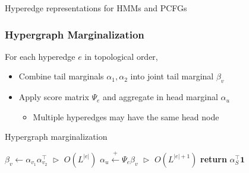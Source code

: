 \documentclass{beamer}
\begin{document}
\begin{frame}
\begin{columns}
\begin{column}{0.5\textwidth}
\begin{center}
\end{center}
\end{column}

\end{columns}

\begin{center}
\small{Hyperedge representations for HMMs and PCFGs}
\end{center}
\end{frame}

\begin{frame}
\frametitle{Hypergraph Marginalization}
For each hyperedge $e$ in topological order,
\vspace{1em}
\begin{itemize}
\item Combine tail marginals $\alpha_1,\alpha_2$ into joint tail marginal $\beta_v$
\vspace{1em}
\item Apply score matrix $\Psi_e$ and aggregate in head marginal $\alpha_u$
    \begin{itemize}
    \item Multiple hyperedges may have the same head node
    \end{itemize}
\end{itemize}
\vspace{1em}
\centering
\begin{algorithm}[H]
\caption{\label{alg:hypergraph-marg} Hypergraph marginalization}
\begin{algorithmic} 
\STATE $\beta_v \gets \alpha_{v_1}\alpha_{v_2}^\top$
    \hfill $\vartriangleright$ $O(L^{|e|})$
\STATE $\alpha_u \stackrel{+}{\gets} \Psi_e\beta_v$
    \hfill $\vartriangleright$ $O(L^{|e|+1})$
\ENDFOR
\STATE \textbf{return} $\alpha_S^\top \mathbf{1}$
\end{algorithmic}

\end{algorithm}
\end{frame}
\end{document}
